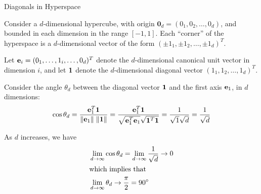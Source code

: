 \begin{frame}{Diagonals in Hyperspace}

Consider a $d$-dimensional hypercube, with origin
${\bm 0}_d = (0_1,0_2,\ldots,0_d)$, and bounded in each dimension in
the range $[-1,1]$. Each \hbox{``corner''} of the hyperspace is a
$d$-dimensional vector of the form $(\pm 1_1, \pm 1_2, \ldots, \pm 1_d)^T$.

\smallskip
Let $\mathbf{e}_i = (0_1, \ldots, 1_i, \ldots, 0_d)^T$ denote the
$d$-dimensional canonical unit vector in dimension $i$,
and let $\mathbf{1}$ denote the $d$-dimensional diagonal vector
$(1_1,1_2,\ldots,1_d)^T$.


\medskip
Consider the angle $\theta_d$ between the diagonal vector
$\mathbf{1}$ and the f\/{i}rst axis $\mathbf{e}_1$, in $d$ dimensions:
\begin{align*}
  \cos\theta_d = \frac{\mathbf{e}_1^T \mathbf{1}}{\|\mathbf{e}_1\| \; \| \mathbf{1}\|} =
  \frac{\mathbf{e}_1^T \mathbf{1}}{\sqrt{\mathbf{e}_1^T\mathbf{e}_1} \sqrt{\mathbf{1}^T\mathbf{1}}} =
  \frac{1}{\sqrt{1}\sqrt{d}}  = \frac{1}{\sqrt{d}}
\end{align*}

\medskip
As $d$ increases, we have
\begin{align*}
& \lim_{d\to \infty} \cos \theta_d =
\lim_{d\to\infty} \frac{1}{\sqrt{d}} \to 0\\
\shortintertext{which implies that}
& \lim_{d\to\infty} \theta_d \to \frac{\pi}{2} = 90^\circ
\end{align*}
\end{frame}


